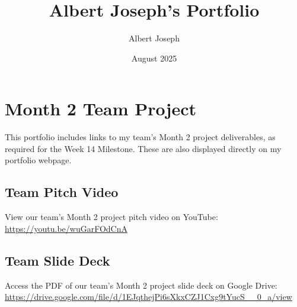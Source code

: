 \documentclass[a4paper,12pt]{article}
\begin{document}
\title{Albert Joseph's Portfolio}
\author{Albert Joseph}
\date{August 2025}
\maketitle

\section*{Month 2 Team Project}
This portfolio includes links to my team's Month 2 project deliverables, as required for the Week 14 Milestone. These are also displayed directly on my portfolio webpage.

\subsection*{Team Pitch Video}
View our team's Month 2 project pitch video on YouTube: \\
\href{https://youtu.be/wuGarFOdCnA?si=fUgXHwErNdA0dVk7}{https://youtu.be/wuGarFOdCnA}

\subsection*{Team Slide Deck}
Access the PDF of our team's Month 2 project slide deck on Google Drive: \\
\href{https://drive.google.com/file/d/1EJqthejPi6sXkxCZJ1Cxg9tYucS__0_a/view?usp=sharing}{https://drive.google.com/file/d/1EJqthejPi6sXkxCZJ1Cxg9tYucS__0_a/view}

\end{document}
